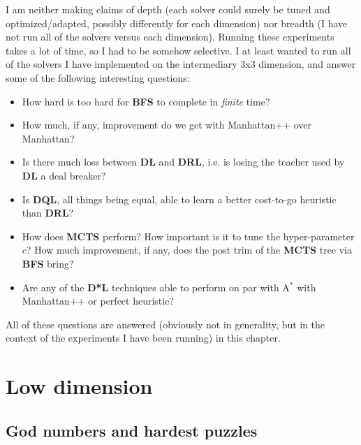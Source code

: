  I am neither making claims of depth (each solver could surely be tuned and optimized/adapted, possibly differently for each dimension) nor breadth (I have not run all of the solvers versus each dimension). Running these experiments takes a lot of time, so I had to be somehow selective. I at least wanted to run all of the solvers I have implemented on the intermediary 3x3 dimension, and answer some of the following interesting questions:
\begin{itemize}
\item How hard is too hard for \textbf{BFS} to complete in \textit{finite} time?
\item How much, if any, improvement do we get with Manhattan++ over Manhattan?
\item Is there much loss between \textbf{DL} and \textbf{DRL}, i.e. is losing the teacher used by \textbf{DL} a deal breaker?
\item Is \textbf{DQL}, all things being equal, able to learn a better cost-to-go heuristic than \textbf{DRL}?
\item How does \textbf{MCTS} perform? How important is it to tune the hyper-parameter $c$? How much improvement, if any, does the post trim of the \textbf{MCTS} tree via \textbf{BFS} bring?
\item Are any of the \textbf{D*L} techniques able to perform on par with A$^{*}$ with Manhattan++ or perfect heuristic?
\end{itemize}
All of these questions are answered (obviously not in generality, but in the context of the experiments I have been running) in this chapter.












\section{Low dimension}
\label{sec:SPLowDimension}

\subsection{God numbers and hardest puzzles}

